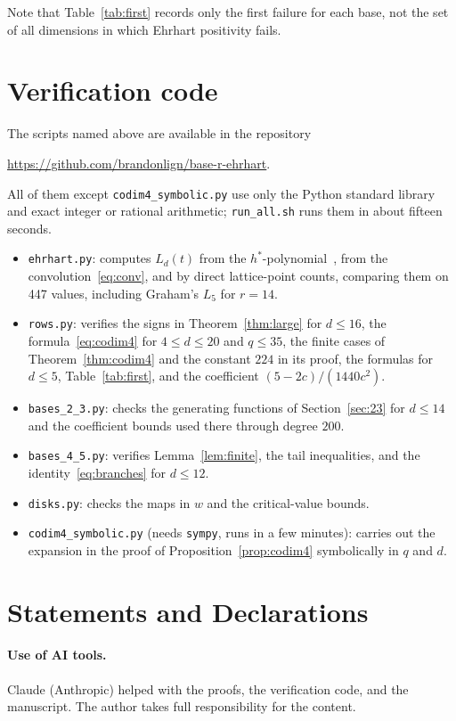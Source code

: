 \documentclass[11pt]{amsart}
\theoremstyle{remark}
\begin{document}
Note that Table~\ref{tab:first} records only the first failure for each base,
not the set of all dimensions in which Ehrhart positivity fails.

\section*{Verification code}

The scripts named above are available in the repository
\begin{center}\url{https://github.com/brandonlign/base-r-ehrhart}.\end{center}
All of them except
\texttt{codim4\_symbolic.py} use only the Python standard library and exact
integer or rational arithmetic; \texttt{run\_all.sh} runs them in about
fifteen seconds.
\begin{itemize}
\item \texttt{ehrhart.py}: computes $L_d(t)$ from the
$h^*$-polynomial~\cite{Sol}, from the convolution~\eqref{eq:conv}, and by
direct lattice-point counts, comparing them on 447 values, including Graham's
$L_5$ for $r=14$.
\item \texttt{rows.py}: verifies the signs in Theorem~\ref{thm:large} for
$d\le16$, the formula~\eqref{eq:codim4} for $4\le d\le20$ and $q\le35$, the
finite cases of Theorem~\ref{thm:codim4} and the constant $224$ in its proof,
the formulas for $d\le5$,
Table~\ref{tab:first}, and the coefficient $(5-2c)/(1440c^2)$.
\item \texttt{bases\_2\_3.py}: checks the generating functions of
Section~\ref{sec:23} for $d\le14$ and the coefficient bounds used there
through degree $200$.
\item \texttt{bases\_4\_5.py}: verifies Lemma~\ref{lem:finite}, the tail
inequalities, and the identity~\eqref{eq:branches} for $d\le12$.
\item \texttt{disks.py}: checks the maps in $w$ and the critical-value bounds.
\item \texttt{codim4\_symbolic.py} (needs \texttt{sympy}, runs in a few
minutes): carries out the expansion in the proof of
Proposition~\ref{prop:codim4} symbolically in $q$ and $d$.
\end{itemize}

\section*{Statements and Declarations}

\paragraph{Use of AI tools.} Claude (Anthropic) helped with the proofs, the verification code, and the
manuscript. The author takes full responsibility for the content.
\end{document}
